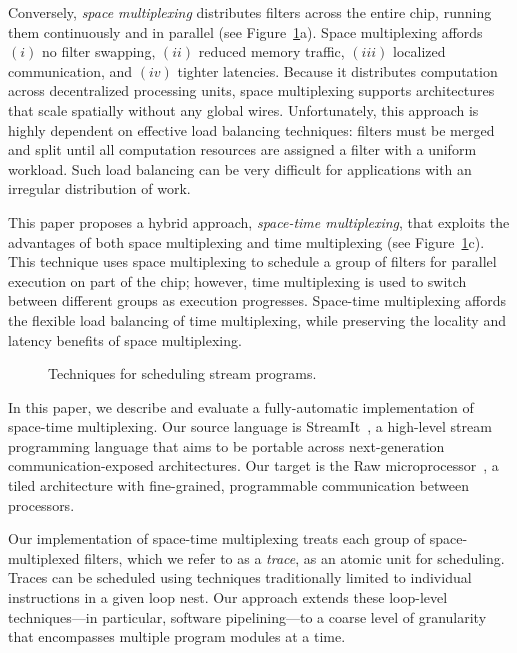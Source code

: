 Conversely, {\it space multiplexing} distributes filters across the
entire chip, running them continuously and in parallel (see
Figure~\ref{fig:spacevstime}a).  Space multiplexing affords $(i)$ no
filter swapping, $(ii)$ reduced memory traffic, $(iii)$ localized
communication, and $(iv)$ tighter latencies.  Because it distributes
computation across decentralized processing units, space multiplexing
supports architectures that scale spatially without any global wires.
Unfortunately, this approach is highly dependent on effective load
balancing techniques: filters must be merged and split until all
computation resources are assigned a filter with a uniform workload.
Such load balancing can be very difficult for applications with an
irregular distribution of work.

This paper proposes a hybrid approach, {\it space-time multiplexing},
that exploits the advantages of both space multiplexing and time
multiplexing (see Figure~\ref{fig:spacevstime}c).  This technique uses
space multiplexing to schedule a group of filters for parallel
execution on part of the chip; however, time multiplexing is used to
switch between different groups as execution progresses.  Space-time
multiplexing affords the flexible load balancing of time multiplexing,
while preserving the locality and latency benefits of space
multiplexing.

\begin{figure}[t]
  \centering
  \vspace{-18pt}
  \vspace{-12pt}
  \caption{Techniques for scheduling stream programs. \protect\label{fig:spacevstime}}
  \vspace{-6pt}
\end{figure}

In this paper, we describe and evaluate a fully-automatic
implementation of space-time multiplexing.  Our source language is
StreamIt~\cite{streamitcc}, a high-level stream programming language
that aims to be portable across next-generation communication-exposed
architectures.  Our target is the Raw
microprocessor~\cite{raw10,raw_isca}, a tiled architecture with
fine-grained, programmable communication between processors.  

Our implementation of space-time multiplexing treats each group of
space-multiplexed filters, which we refer to as a {\it trace}, as an
atomic unit for scheduling.  Traces can be scheduled using techniques
traditionally limited to individual instructions in a given loop nest.
Our approach extends these loop-level techniques---in particular,
software pipelining---to a coarse level of granularity that
encompasses multiple program modules at a time.

